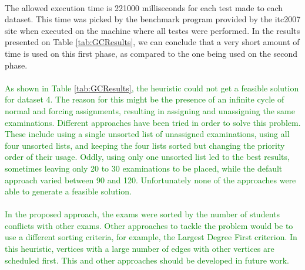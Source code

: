 \\
The allowed execution time is 221000 milliseconds for each test made to each dataset. This time was picked by the benchmark program provided by the \gls{itc2007} site \cite{McCollum2007e} when executed on the machine where all testes were performed. In the results presented on Table \ref{tab:GCResults}, we can conclude that a very short amount of time is used on this first phase, as compared to the one being used on the second phase.\\
\\
\textcolor{green}{As shown in Table \ref{tab:GCResults}, the heuristic could not get a feasible solution for dataset 4. The reason for this might be the presence of an infinite cycle of normal and forcing assignments, resulting in assigning and unassigning the same examinations. Different approaches have been tried in order to solve this problem. These include using a single unsorted list of unassigned examinations, using all four unsorted lists, and keeping the four lists sorted but changing the priority order of their usage. Oddly, using only one unsorted list led to the best results, sometimes leaving only 20 to 30 examinations to be placed, while the default approach varied between 90 and 120. Unfortunately none of the approaches were able to generate a feasible solution.\\
\\
In the proposed approach, the exams were sorted by the number of students conflicts with other exams. Other approaches to tackle the problem would be to use a different sorting criteria, for example, the Largest Degree First criterion. In this heuristic, vertices with a large number of edges with other vertices  are scheduled first. This and other approaches should be developed in future work.}